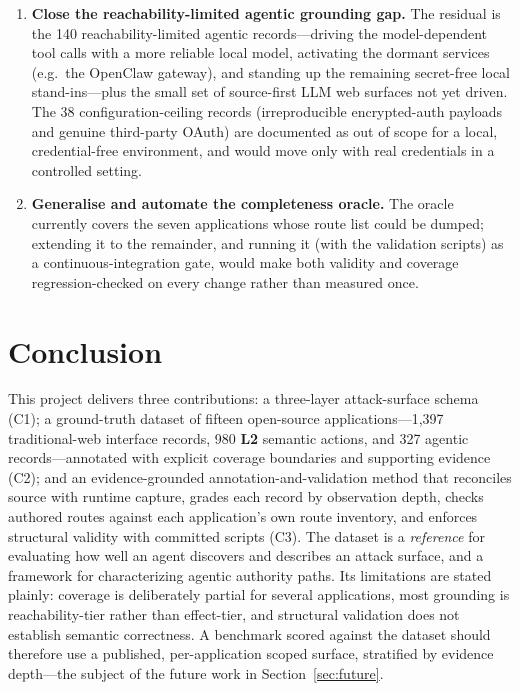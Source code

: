 \documentclass[11pt,a4paper]{article}
\newcommand{\cd}[1]{\lstinline[basicstyle=\ttfamily\small]|#1|}
\renewcommand{\L}[1]{\textbf{L#1}}
\begin{document}
\begin{enumerate}[leftmargin=1.6em,itemsep=3pt]
      \cd{effect} tier (currently 276 of 980) would make more of the ground truth
      effect-proven, which directly raises the confidence of any benchmark scored against
      it.
\item \textbf{Close the reachability-limited agentic grounding gap.} The residual is the
      140 reachability-limited agentic records---driving the model-dependent tool calls
      with a more reliable local model, activating the dormant services (e.g.\ the
      OpenClaw gateway), and standing up the remaining secret-free local stand-ins---plus
      the small set of source-first LLM web surfaces not yet driven. The 38
      configuration-ceiling records (irreproducible encrypted-auth payloads and genuine
      third-party OAuth) are documented as out of scope for a local, credential-free
      environment, and would move only with real credentials in a controlled setting.
\item \textbf{Generalise and automate the completeness oracle.} The oracle currently
      covers the seven applications whose route list could be dumped; extending it to the
      remainder, and running it (with the validation scripts) as a continuous-integration
      gate, would make both validity and coverage regression-checked on every change rather
      than measured once.
\end{enumerate}

\section{Conclusion}
This project delivers three contributions: a three-layer attack-surface schema (C1); a
ground-truth dataset of fifteen open-source applications---1{,}397 traditional-web interface
records, 980 \L2 semantic actions, and 327 agentic records---annotated with explicit coverage
boundaries and supporting evidence (C2); and an evidence-grounded annotation-and-validation
method that reconciles source with runtime capture, grades each record by observation depth,
checks authored routes against each application's own route inventory, and enforces structural
validity with committed scripts (C3). The dataset is a \emph{reference} for evaluating how
well an agent discovers and describes an attack surface, and a framework for characterizing
agentic authority paths. Its limitations are stated plainly: coverage is deliberately partial
for several applications, most grounding is reachability-tier rather than effect-tier, and
structural validation does not establish semantic correctness. A benchmark scored against the
dataset should therefore use a published, per-application scoped surface, stratified by
evidence depth---the subject of the future work in Section~\ref{sec:future}.
\end{document}
